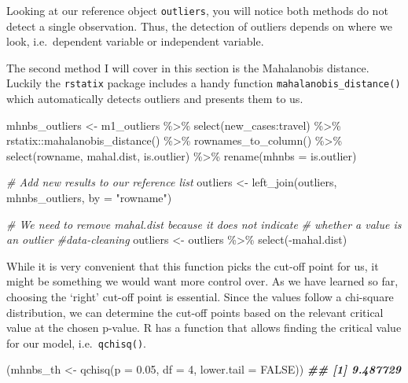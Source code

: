 \documentclass[
]{book}
\newenvironment{Shaded}{\begin{snugshade}}{\end{snugshade}}
\newcommand{\AttributeTok}[1]{\textcolor[rgb]{0.77,0.63,0.00}{#1}}
\newcommand{\CommentTok}[1]{\textcolor[rgb]{0.56,0.35,0.01}{\textit{#1}}}
\newcommand{\ConstantTok}[1]{\textcolor[rgb]{0.00,0.00,0.00}{#1}}
\newcommand{\DecValTok}[1]{\textcolor[rgb]{0.00,0.00,0.81}{#1}}
\newcommand{\DocumentationTok}[1]{\textcolor[rgb]{0.56,0.35,0.01}{\textbf{\textit{#1}}}}
\newcommand{\FloatTok}[1]{\textcolor[rgb]{0.00,0.00,0.81}{#1}}
\newcommand{\FunctionTok}[1]{\textcolor[rgb]{0.00,0.00,0.00}{#1}}
\newcommand{\NormalTok}[1]{#1}
\newcommand{\OtherTok}[1]{\textcolor[rgb]{0.56,0.35,0.01}{#1}}
\newcommand{\SpecialCharTok}[1]{\textcolor[rgb]{0.00,0.00,0.00}{#1}}
\newcommand{\StringTok}[1]{\textcolor[rgb]{0.31,0.60,0.02}{#1}}
\begin{document}
Looking at our reference object \texttt{outliers}, you will notice both methods do not detect a single observation. Thus, the detection of outliers depends on where we look, i.e.~dependent variable or independent variable.

The second method I will cover in this section is the Mahalanobis distance. Luckily the \texttt{rstatix} package includes a handy function \texttt{mahalanobis\_distance()} which automatically detects outliers and presents them to us.

\begin{Shaded}
\begin{Highlighting}[]
\NormalTok{mhnbs\_outliers }\OtherTok{\textless{}{-}}\NormalTok{ m1\_outliers }\SpecialCharTok{\%\textgreater{}\%}
  \FunctionTok{select}\NormalTok{(new\_cases}\SpecialCharTok{:}\NormalTok{travel) }\SpecialCharTok{\%\textgreater{}\%}
\NormalTok{  rstatix}\SpecialCharTok{::}\FunctionTok{mahalanobis\_distance}\NormalTok{() }\SpecialCharTok{\%\textgreater{}\%}
  \FunctionTok{rownames\_to\_column}\NormalTok{() }\SpecialCharTok{\%\textgreater{}\%}
  \FunctionTok{select}\NormalTok{(rowname, mahal.dist, is.outlier) }\SpecialCharTok{\%\textgreater{}\%}
  \FunctionTok{rename}\NormalTok{(}\AttributeTok{mhnbs =}\NormalTok{ is.outlier)}

\CommentTok{\# Add new results to our reference list}
\NormalTok{outliers }\OtherTok{\textless{}{-}} \FunctionTok{left\_join}\NormalTok{(outliers, mhnbs\_outliers, }\AttributeTok{by =} \StringTok{"rowname"}\NormalTok{)}

\CommentTok{\# We need to remove mahal.dist because it does not indicate}
\CommentTok{\# whether a value is an outlier \#data{-}cleaning}
\NormalTok{outliers }\OtherTok{\textless{}{-}}\NormalTok{ outliers }\SpecialCharTok{\%\textgreater{}\%} \FunctionTok{select}\NormalTok{(}\SpecialCharTok{{-}}\NormalTok{mahal.dist)}
\end{Highlighting}
\end{Shaded}

While it is very convenient that this function picks the cut-off point for us, it might be something we would want more control over. As we have learned so far, choosing the `right' cut-off point is essential. Since the values follow a chi-square distribution, we can determine the cut-off points based on the relevant critical value at the chosen p-value. R has a function that allows finding the critical value for our model, i.e.~\texttt{qchisq()}.

\begin{Shaded}
\begin{Highlighting}[]
\NormalTok{(mhnbs\_th }\OtherTok{\textless{}{-}} \FunctionTok{qchisq}\NormalTok{(}\AttributeTok{p =} \FloatTok{0.05}\NormalTok{,}
                   \AttributeTok{df =} \DecValTok{4}\NormalTok{,}
                   \AttributeTok{lower.tail =} \ConstantTok{FALSE}\NormalTok{))}
\DocumentationTok{\#\# [1] 9.487729}
\end{Highlighting}
\end{Shaded}
\end{document}
